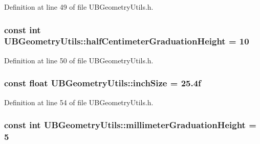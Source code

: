 Definition at line 49 of file U\-B\-Geometry\-Utils.\-h.

\hypertarget{class_u_b_geometry_utils_a619b34e990f58aecca2a3f029fade400}{
\subsubsection[{half\-Centimeter\-Graduation\-Height}]{\setlength{\rightskip}{0pt plus 5cm}const int U\-B\-Geometry\-Utils\-::half\-Centimeter\-Graduation\-Height = 10\hspace{0.3cm}{\ttfamily [static]}}}\label{d3/dff/class_u_b_geometry_utils_a619b34e990f58aecca2a3f029fade400}


Definition at line 50 of file U\-B\-Geometry\-Utils.\-h.

\hypertarget{class_u_b_geometry_utils_a1f5d4e8f0ad9766ef4325e41562b5d33}{
\subsubsection[{inch\-Size}]{\setlength{\rightskip}{0pt plus 5cm}const float U\-B\-Geometry\-Utils\-::inch\-Size = 25.\-4f\hspace{0.3cm}{\ttfamily [static]}}}\label{d3/dff/class_u_b_geometry_utils_a1f5d4e8f0ad9766ef4325e41562b5d33}


Definition at line 54 of file U\-B\-Geometry\-Utils.\-h.

\hypertarget{class_u_b_geometry_utils_a73d6393ad58bf658d1dfc10cebb61921}{
\subsubsection[{millimeter\-Graduation\-Height}]{\setlength{\rightskip}{0pt plus 5cm}const int U\-B\-Geometry\-Utils\-::millimeter\-Graduation\-Height = 5\hspace{0.3cm}{\ttfamily [static]}}}\label{d3/dff/class_u_b_geometry_utils_a73d6393ad58bf658d1dfc10cebb61921}


